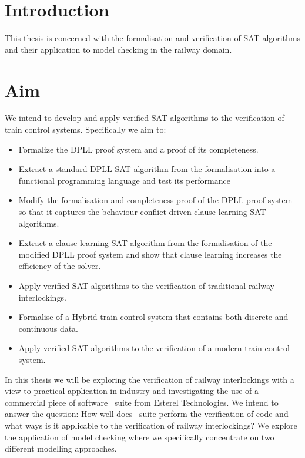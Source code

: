 

\section{Introduction}

This thesis is concerned with the formalisation and verification of SAT algorithms and their application to model checking in the railway domain. 


\section{Aim}
We intend to develop and apply verified SAT algorithms to the verification of train control systems. Specifically we aim to: 

\begin{itemize}

\item Formalize the DPLL proof system and a proof of its completeness.

\item Extract a standard DPLL SAT algorithm from the formalisation into a functional programming language and test its performance

\item Modify the formalisation and completeness proof  of the DPLL proof system so that it captures the behaviour conflict driven clause learning SAT algorithms.

\item Extract a clause learning SAT algorithm from the formalisation  of the modified DPLL proof system and show that clause learning increases the efficiency of the solver.

\item Apply verified SAT algorithms to the verification of traditional railway interlockings. 

\item Formalise of a Hybrid train control system that contains both discrete and continuous data.

\item Apply verified SAT algorithms to the verification of a modern train control system.

\end{itemize}





In this thesis we will be exploring the verification of railway 
interlockings with a
view to practical application in industry and investigating the use of a
commercial piece of software \scade \ suite from Esterel Technologies. We intend to answer the question: How well does \scade \ suite perform the
verification of code and what ways is it applicable to the verification of
railway interlockings? We explore the application of model checking where
we specifically concentrate on two different modelling approaches.


